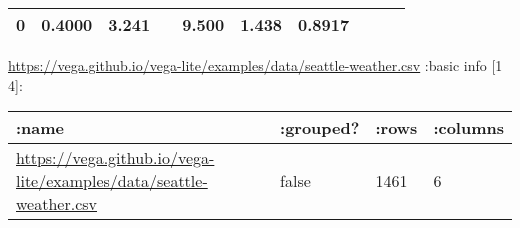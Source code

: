 \documentclass[]{article}
\begin{document}
\begin{longtable}[]{@{}llllllllll@{}}
\begin{minipage}[t]{0.07\columnwidth}
0\strut
\end{minipage} & \begin{minipage}[t]{0.07\columnwidth}\raggedright\strut
0.4000\strut
\end{minipage} & \begin{minipage}[t]{0.07\columnwidth}\raggedright\strut
3.241\strut
\end{minipage} & \begin{minipage}[t]{0.04\columnwidth}\raggedright\strut
\strut
\end{minipage} & \begin{minipage}[t]{0.07\columnwidth}\raggedright\strut
9.500\strut
\end{minipage} & \begin{minipage}[t]{0.12\columnwidth}\raggedright\strut
1.438\strut
\end{minipage} & \begin{minipage}[t]{0.05\columnwidth}\raggedright\strut
0.8917\strut
\end{minipage}\tabularnewline
\bottomrule
\end{longtable}

\url{https://vega.github.io/vega-lite/examples/data/seattle-weather.csv}
:basic info {[}1 4{]}:

\begin{longtable}[]{@{}llll@{}}
\toprule
\begin{minipage}[b]{0.61\columnwidth}\raggedright\strut
:name\strut
\end{minipage} & \begin{minipage}[b]{0.11\columnwidth}\raggedright\strut
:grouped?\strut
\end{minipage} & \begin{minipage}[b]{0.07\columnwidth}\raggedright\strut
:rows\strut
\end{minipage} & \begin{minipage}[b]{0.10\columnwidth}\raggedright\strut
:columns\strut
\end{minipage}\tabularnewline
\midrule
\endhead
\begin{minipage}[t]{0.61\columnwidth}\raggedright\strut
\url{https://vega.github.io/vega-lite/examples/data/seattle-weather.csv}\strut
\end{minipage} & \begin{minipage}[t]{0.11\columnwidth}\raggedright\strut
false\strut
\end{minipage} & \begin{minipage}[t]{0.07\columnwidth}\raggedright\strut
1461\strut
\end{minipage} & \begin{minipage}[t]{0.10\columnwidth}\raggedright\strut
6\strut
\end{minipage}\tabularnewline
\bottomrule
\end{longtable}
\end{document}
